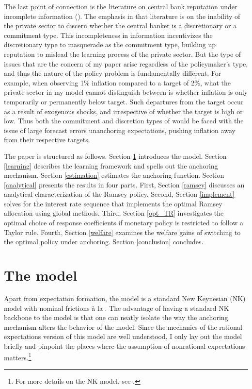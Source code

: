 \documentclass[11pt]{article}
\renewcommand{\[}{\begin{equation}}
\renewcommand{\]}{\end{equation}}
\begin{document}
The last point of connection is the literature on central bank reputation under incomplete information (\cite{barro1986}). The emphasis in that literature is on the inability of the private sector to discern whether the central banker is a discretionary or a commitment type. This incompleteness in information incentivizes the discretionary type to masquerade as the commitment type, building up reputation to mislead the learning process of the private sector. But the type of issues that are the concern of my paper arise regardless of the policymaker's type, and thus the nature of the policy problem is fundamentally different. For example, when observing 1\% inflation compared to a target of 2\%, what the private sector in my model cannot distinguish between is whether inflation is only temporarily or permanently below target. Such departures from the target occur as a result of exogenous shocks, and irrespective of whether the target is high or low. Thus both the commitment and discretion types of \cite{barro1986} would be faced with the issue of large forecast errors unanchoring expectations, pushing inflation away from their respective targets.

The paper is structured as follows. Section \ref{NK} introduces the model. Section \ref{learning} describes the learning framework and spells out the anchoring mechanism. Section \ref{estimation} estimates the anchoring function. Section \ref{analytical} presents the results in four parts. First, Section \ref{ramsey} discusses an analytical characterization of the Ramsey policy. Second, Section \ref{implement} solves for the interest rate sequence that implements the optimal Ramsey allocation using global methods. Third, Section \ref{opt_TR} investigates the optimal choice of response coefficients if monetary policy is restricted to follow a Taylor rule. Fourth, Section \ref{welfare} examines the welfare gains of switching to the optimal policy under anchoring. Section \ref{conclusion} concludes.

\section{The model}\label{NK}
Apart from expectation formation, the model is a standard New Keynesian (NK) model with nominal frictions \`a la \cite{calvo1983staggered}. The advantage of having a standard NK backbone to the model is that one can neatly isolate the way the anchoring mechanism alters the behavior of the model. Since the mechanics of the rational expectations version of this model are well understood, I only lay out the model briefly and pinpoint the places where the assumption of nonrational expectations matters.\footnote{For more details on the NK model, see \cite{woodford2011interest}.}
\end{document}
